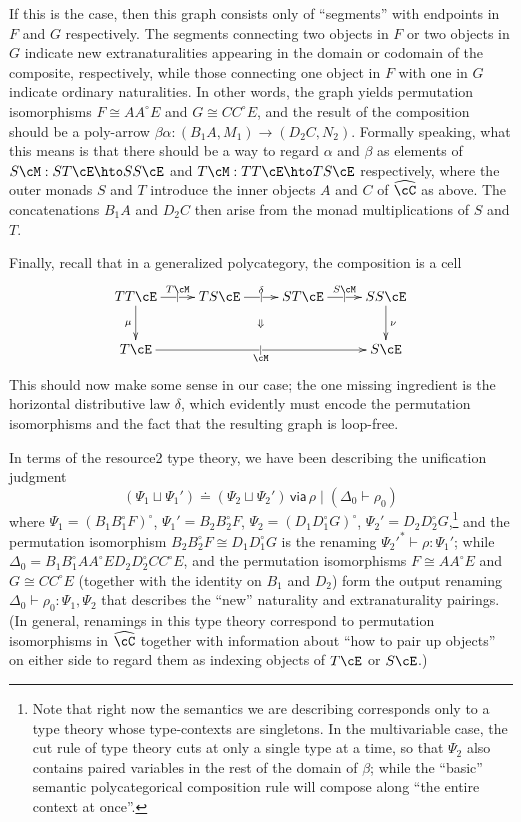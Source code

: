 \documentclass{amsart}
\newcommand{\C}{\cC}
\renewcommand{\Chat}{\ensuremath{\widehat{\C}}\xspace}
\newcommand{\E}{\cE}
\renewcommand{\o}{^{\circ}}
\let\types\vdash %
\def\cb{\mid} %
\newcommand\combine{,}
\newcommand\combineU{\sqcup}
\def\flip#1{#1^*} %
\newcommand{\unif}[4]{#1\doteq #2\,\mathsf{ via }\,#3\cb #4}
\begin{document}
If this is the case, then this graph consists only of ``segments'' with endpoints in $F$ and $G$ respectively.
The segments connecting two objects in $F$ or two objects in $G$ indicate new extranaturalities appearing in the domain or codomain of the composite, respectively, while those connecting one object in $F$ with one in $G$ indicate ordinary naturalities.
In other words, the graph yields permutation isomorphisms $F \cong A A\o E$ and $G \cong C C\o E$, and the result of the composition should be a poly-arrow $\beta\alpha : (B_1 A, M_1) \to (D_2 C,N_2)$.
Formally speaking, what this means is that there should be a way to regard $\alpha$ and $\beta$ as elements of $S\cM : ST\E \hto SS\E$ and $T\cM : TT\E \hto TS\E$ respectively, where the outer monads $S$ and $T$ introduce the inner objects $A$ and $C$ of \Chat as above.
The concatenations $B_1 A$ and $D_2 C$ then arise from the monad multiplications of $S$ and $T$.

Finally, recall that in a generalized polycategory, the composition is a cell
\[ \xymatrix{ TT\E \ar[r]|{|}^{T \cM} \ar[d]_{\mu} \ar@{}[drrr]|{\Downarrow} &
  T S \E \ar[r]|{|}^{\delta} & S T \E \ar[r]|{|}^{S \cM} & S S \E \ar[d]^{\nu}\\
  T \E \ar[rrr]|{|}_\cM &&& S \E}\]
This should now make some sense in our case; the one missing ingredient is the horizontal distributive law $\delta$, which evidently must encode the permutation isomorphisms and the fact that the resulting graph is loop-free.

In terms of the resource2 type theory, we have been describing the unification judgment
\[
\unif{(\Psi_1 \combineU \Psi_1')} {(\Psi_2 \combineU \Psi_2')} {\rho} {(\Delta_0 \vdash \rho_0)}
\]
where $\Psi_1 = (B_1 B_1\o F)\o$, $\Psi_1' = B_2 B_2\o F$, $\Psi_2 = (D_1 D_1\o G)\o$, $\Psi_2' = D_2 D_2\o G$,\footnote{Note that right now the semantics we are describing corresponds only to a type theory whose type-contexts are singletons.  In the multivariable case, the cut rule of type theory cuts at only a single type at a time, so that $\Psi_2$ also contains paired variables in the rest of the domain of $\beta$; while the ``basic'' semantic polycategorical composition rule will compose along ``the entire context at once''.} and the permutation isomorphism $B_2 B_2\o F \cong D_1 D_1\o G$ is the renaming $\flip{\Psi_2'} \types \rho : \Psi_1'$; while $\Delta_0 = B_1 B_1\o A A\o E D_2 D_2\o C C\o E$, and the permutation isomorphisms $F \cong A A\o E$ and $G \cong C C\o E$ (together with the identity on $B_1$ and $D_2$) form the output renaming $\Delta_0 \vdash \rho_0 : \Psi_1 \combine \Psi_2$ that describes the ``new'' naturality and extranaturality pairings.
(In general, renamings in this type theory correspond to permutation isomorphisms in \Chat together with information about ``how to pair up objects'' on either side to regard them as indexing objects of $T\E$ or $S\E$.)
\end{document}
